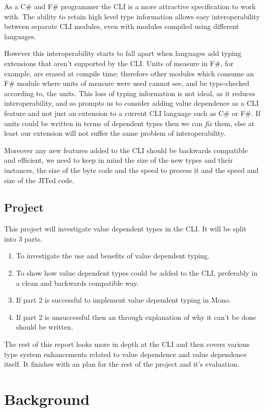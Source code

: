 \documentclass[english]{report}
\begin{document}
As a C\# and F\# programmer the CLI is a more attractive specification
to work with. The ability to retain high level type information allows
easy interoperability between separate CLI modules, even with modules
compiled using different languages.

However this interoperability starts to fall apart when languages
add typing extensions that aren't supported by the CLI. Units of measure
in F\#, for example, are erased at compile time; therefore other modules
which consume an F\# module where units of measure were used cannot
see, and be type-checked according to, the units. This loss of typing
information is not ideal, as it reduces interoperability, and so prompts
us to consider adding value dependence as a CLI feature and not just
an extension to a current CLI language such as C\# or F\#. If units
could be written in terms of dependent types then we can \emph{fix}
them, else at least our extension will not suffer the same problem
of interoperability. 

Moreover any new features added to the CLI should be backwards compatible
and efficient, we need to keep in mind the size of the new types and
their instances, the size of the byte code and the speed to process
it and the speed and size of the JITed code.


\section{Project}

This project will investigate value dependent types in the CLI. It
will be split into 3 parts. 
\begin{enumerate}
\item To investigate the use and benefits of value dependent typing.
\item To show how value dependent types could be added to the CLI, preferably
in a clean and backwards compatible way.
\item If part 2 is successful to implement value dependent typing in Mono. 
\item If part 2 is unsuccessful then an through explanation of why it can't
be done should be written.
\end{enumerate}
The rest of this report looks more in depth at the CLI and then covers
various type system enhancements related to value dependence and value
dependence itself. It finishes with an plan for the rest of the project
and it's evaluation.


\chapter{Background}
\end{document}

